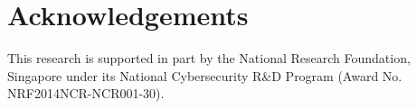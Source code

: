 \documentclass[10pt,journal,compsoc]{IEEEtran}
\begin{document}




%
%
%
%












\vspace{-3mm}

\vspace{-1mm}

\vspace{-1mm}
\section{Acknowledgements}
This research is supported in part by the National Research Foundation, Singapore under its National Cybersecurity R$\&$D Program (Award No. NRF2014NCR-NCR001-30).


\balance






\end{document}
